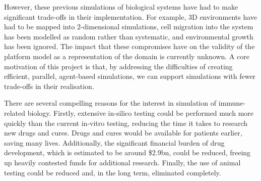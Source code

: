 \documentclass{UoYCSproject}
\begin{document}
However, these previous simulations of biological systems have had to make significant trade-offs in their implementation.
For example, 3D environments have had to be mapped into 2-dimensional simulations, cell migration into the system has been modelled as random rather than systematic\cite{kieran_thesis}, and environmental growth has been ignored\cite{phil_diss}.
The impact that these compromises have on the validity of the platform model as a representation of the domain is currently unknown.
A core motivation of this project is that, by addressing the difficulties of creating efficient, parallel, agent-based simulations, we can support simulations with fewer trade-offs in their realisation.

There are several compelling reasons for the interest in simulation of immune-related biology.
Firstly, extensive \gls{in-silico} testing could be performed much more quickly than the current \gls{in-vitro} testing, reducing the time it takes to research new drugs and cures.
Drugs and cures would be available for patients earlier, saving many lives.
Additionally, the significant financial burden of drug development, which is estimated to be around \$2.9bn\cite{drug_cost}, could be reduced, freeing up heavily contested funds for additional research. Finally, the use of animal testing could be reduced and, in the long term, eliminated completely.
\end{document}
